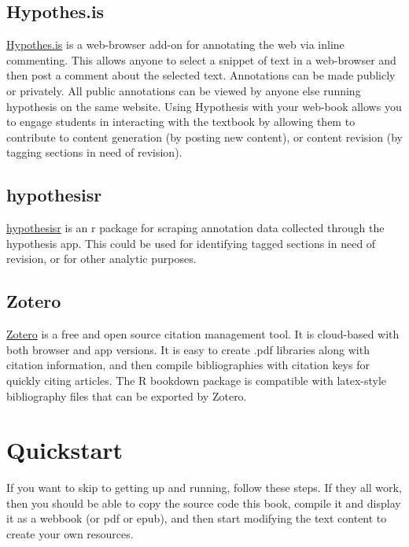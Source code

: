\documentclass[
]{book}
\begin{document}
\hypertarget{hypothes.is}{%
\subsection{Hypothes.is}\label{hypothes.is}}

\href{https://web.hypothes.is}{Hypothes.is} is a web-browser add-on for annotating the web via inline commenting. This allows anyone to select a snippet of text in a web-browser and then post a comment about the selected text. Annotations can be made publicly or privately. All public annotations can be viewed by anyone else running hypothesis on the same website. Using Hypothesis with your web-book allows you to engage students in interacting with the textbook by allowing them to contribute to content generation (by posting new content), or content revision (by tagging sections in need of revision).

\hypertarget{hypothesisr}{%
\subsection{hypothesisr}\label{hypothesisr}}

\href{https://github.com/mdlincoln/hypothesisr}{hypothesisr} is an r package for scraping annotation data collected through the hypothesis app. This could be used for identifying tagged sections in need of revision, or for other analytic purposes.

\hypertarget{zotero}{%
\subsection{Zotero}\label{zotero}}

\href{https://www.zotero.org}{Zotero} is a free and open source citation management tool. It is cloud-based with both browser and app versions. It is easy to create .pdf libraries along with citation information, and then compile bibliographies with citation keys for quickly citing articles. The R bookdown package is compatible with latex-style bibliography files that can be exported by Zotero.

\hypertarget{quickstart}{%
\section{Quickstart}\label{quickstart}}

If you want to skip to getting up and running, follow these steps. If they all work, then you should be able to copy the source code this book, compile it and display it as a webbook (or pdf or epub), and then start modifying the text content to create your own resources.
\end{document}
